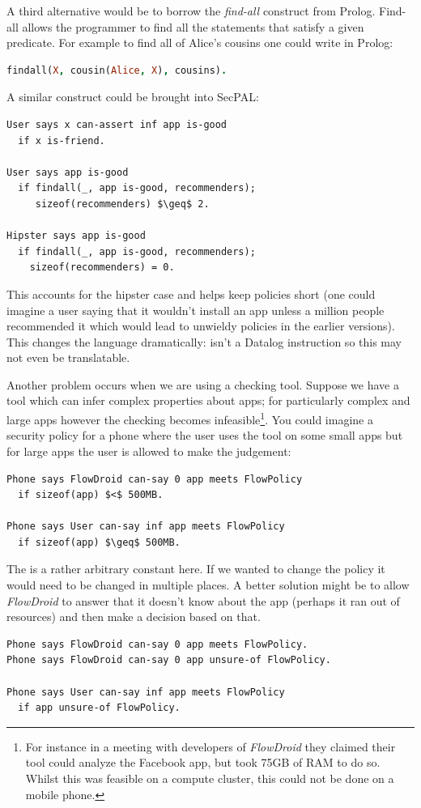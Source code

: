 \documentclass[a4paper]{article}
\begin{document}
A third alternative would be to borrow the \emph{find-all}
construct from Prolog. Find-all allows the programmer to find all the statements
that satisfy a given predicate.  For example to find all of Alice's cousins one
could write in Prolog:
\begin{lstlisting}[language=Prolog]
  findall(X, cousin(Alice, X), cousins).
\end{lstlisting}
A similar construct could be brought into SecPAL:
\begin{lstlisting}[language=SecPAL, mathescape=true]
User says x can-assert inf app is-good
  if x is-friend.

User says app is-good
  if findall(_, app is-good, recommenders);
     sizeof(recommenders) $\geq$ 2.

Hipster says app is-good
  if findall(_, app is-good, recommenders);
    sizeof(recommenders) = 0.
\end{lstlisting}
This accounts for the hipster case and helps keep policies short (one could
imagine a user saying that it wouldn't install an app unless a million people
recommended it which would lead to unwieldy policies in the earlier versions).
This changes the language dramatically:  isn't a Datalog
instruction so this may not even be translatable.

Another problem occurs when we are using a checking tool.  Suppose we have a
tool which can infer complex properties about apps; for particularly complex and
large apps however the checking becomes infeasible\footnote{For instance in a
  meeting with developers of \emph{FlowDroid} they claimed their tool could
  analyze the Facebook app, but took 75GB of RAM to do so. Whilst this was
  feasible on a compute cluster, this could not be done on a mobile phone.}. You
could imagine a security policy for a phone where the user uses the tool on some
small apps but for large apps the user is allowed to make the judgement:
\begin{lstlisting}[language=SecPAL,mathescape=true]
Phone says FlowDroid can-say 0 app meets FlowPolicy
  if sizeof(app) $<$ 500MB.

Phone says User can-say inf app meets FlowPolicy
  if sizeof(app) $\geq$ 500MB.
\end{lstlisting}
The  is a rather arbitrary constant here. If we wanted to change the
policy it would need to be changed in multiple places.  A better solution might
be to allow \emph{FlowDroid} to answer that it doesn't know about the app
(perhaps it ran out of resources) and then make a decision based on that.
\begin{lstlisting}[language=SecPAL]
Phone says FlowDroid can-say 0 app meets FlowPolicy.
Phone says FlowDroid can-say 0 app unsure-of FlowPolicy.

Phone says User can-say inf app meets FlowPolicy
  if app unsure-of FlowPolicy.
\end{lstlisting}
\end{document}
